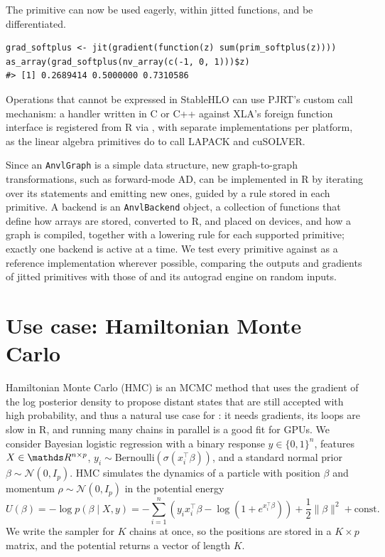 The primitive can now be used eagerly, within jitted functions, and be differentiated.

\begin{verbatim}
grad_softplus <- jit(gradient(function(z) sum(prim_softplus(z))))
as_array(grad_softplus(nv_array(c(-1, 0, 1)))$z)
#> [1] 0.2689414 0.5000000 0.7310586
\end{verbatim}

Operations that cannot be expressed in StableHLO can use PJRT's custom call mechanism: a handler written in C or C++ against XLA's foreign function interface is registered from R via , with separate implementations per platform, as the linear algebra primitives do to call LAPACK and cuSOLVER.

Since an \texttt{AnvlGraph} is a simple data structure, new graph-to-graph transformations, such as forward-mode AD, can be implemented in R by iterating over its statements and emitting new ones, guided by a rule stored in each primitive.
A backend is an \texttt{AnvlBackend} object, a collection of functions that define how arrays are stored, converted to R, and placed on devices, and how a graph is compiled, together with a lowering rule for each supported primitive; exactly one backend is active at a time.
We test every primitive against  as a reference implementation wherever possible, comparing the outputs and gradients of jitted primitives with those of  and its autograd engine on random inputs.

\section{Use case: Hamiltonian Monte Carlo}\label{hmc}

Hamiltonian Monte Carlo (HMC) \citep{ref-neal2011mcmc} is an MCMC method that uses the gradient of the log posterior density to propose distant states that are still accepted with high probability, and thus a natural use case for : it needs gradients, its loops are slow in R, and running many chains in parallel is a good fit for GPUs.
We consider Bayesian logistic regression with a binary response \(y \in \{0, 1\}^n\), features \(X \in \R^{n \times p}\), \(y_i \sim \text{Bernoulli}(\sigma(x_i^\top \beta))\), and a standard normal prior \(\beta \sim \mathcal{N}(0, I_p)\).
HMC simulates the dynamics of a particle with position \(\beta\) and momentum \(\rho \sim \mathcal{N}(0, I_p)\) in the potential energy
\[U(\beta) = -\log p(\beta \mid X, y) = -\sum_{i = 1}^n \left(y_i x_i^\top \beta - \log(1 + e^{x_i^\top \beta})\right) + \frac{1}{2}\lVert \beta \rVert^2 + \text{const}.\]
We write the sampler for \(K\) chains at once, so the positions are stored in a \(K \times p\) matrix, and the potential returns a vector of length \(K\).

